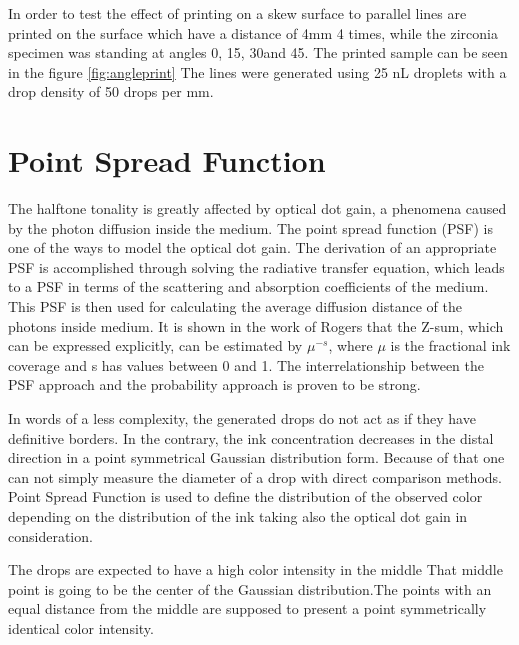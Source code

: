 	\bigskip

In order to test the effect of printing on a skew surface to parallel lines are printed on the surface which have a distance of 4mm 4 times, while the zirconia specimen was standing at angles 0\textdegree, 15\textdegree, 30\textdegree and 45\textdegree. The printed sample can be seen in the figure \ref{fig:angleprint}
The lines were generated using 25 nL droplets with a drop density of 50 drops per mm.

\section{Point Spread Function}


The halftone tonality is greatly affected by optical dot gain, a phenomena caused by the photon diffusion inside the medium. The point spread function (PSF) is one of the ways to model the optical dot gain. The derivation of an appropriate PSF is accomplished through solving the radiative transfer equation, which leads to a PSF in terms of the scattering and absorption coefficients of the medium. This PSF is then used for calculating the average diffusion distance of the photons inside medium. It is shown in the work of Rogers that the Z-sum, which can be expressed explicitly, can be estimated by $\mu^{-s}$, where $\mu$ is the fractional ink coverage and s has values between 0 and 1.  The interrelationship  between the PSF  approach and the probability approach is proven to be strong. \citep{rogers2015point}

In words of a less complexity, the generated drops do not act as if they have definitive borders. In the contrary, the ink concentration decreases in the distal direction in a point symmetrical Gaussian distribution form. Because of that one can not simply measure the diameter of a drop with direct comparison methods. Point Spread Function is used to define the distribution of the observed color depending on the distribution of the ink taking also the optical dot gain in consideration.

The drops are expected to have a high color intensity in the middle That middle point is going to be the center of the Gaussian distribution.The points with an equal distance from the middle are supposed to present a point symmetrically identical color intensity.

\bigskip

